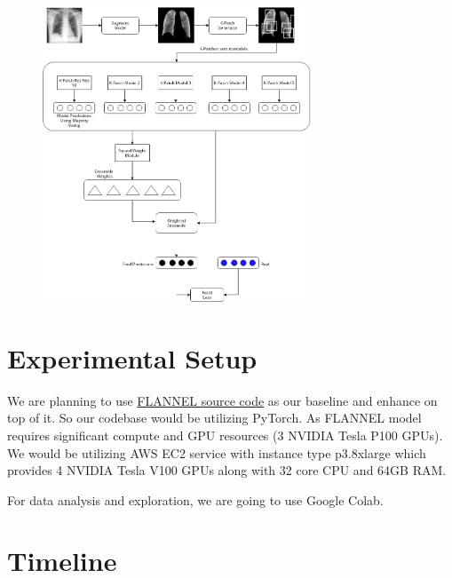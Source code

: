 \documentclass{sigkddExp}
\begin{document}
\begin{figure}[h]
    \includegraphics[width=8cm]{../doc/images/FLANNEL-IMPROVED.png}
\end{figure}


\section{Experimental Setup}

We are planning to use \href{https://github.com/qxiaobu/FLANNEL} {FLANNEL source
code}  as our baseline and enhance on top of it. So our codebase would be
utilizing PyTorch. As FLANNEL model requires significant compute and GPU
resources (3 NVIDIA Tesla P100 GPUs). We would be utilizing AWS EC2 service with
instance type p3.8xlarge which provides 4 NVIDIA Tesla V100 GPUs along with 32
core CPU and 64GB RAM.

For data analysis and exploration, we are going to use Google Colab.


\section{Timeline}
\end{document}
